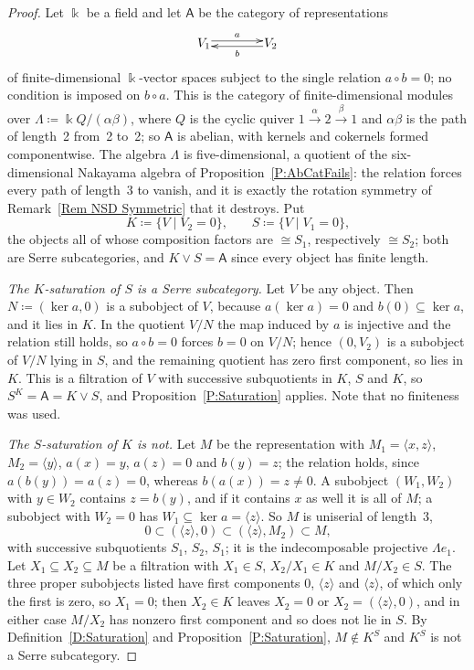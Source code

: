\documentclass[reqno,a4paper]{amsart}
\numberwithin{equation}{section}
\theoremstyle{plain}
\theoremstyle{definition}
\def\nameit#1{\textrm{#1}~}
\def\prox{\nameit{Proposition}}
\def\defx{\nameit{Definition}}
\def\remx{\nameit{Remark}}
\newcommand{\comp}{\circ}
\newcommand{\iso}{\cong}
\newcommand{\onecat}[1]{\ensuremath{\mathsf{#1}}\xspace}
\renewcommand{\1}{\onecat{1}}
\begin{document}
\begin{proof}
	Let \(\Bbbk\) be a field and let \(\onecat{A}\) be the category of representations
	\[
		\xymatrix@1@C=4em{V_{1} \ar@<.5ex>[r]^-{a} & V_{2} \ar@<.5ex>[l]^-{b}}
	\]
	of finite-dimensional \(\Bbbk\)-vector spaces subject to the single relation \(a\comp b=0\); no condition is imposed on \(b\comp a\). This is the category of finite-dimensional modules over \(\Lambda\coloneq\Bbbk Q/(\alpha\beta)\), where \(Q\) is the cyclic quiver \(1\xrightarrow{\alpha}2\xrightarrow{\beta}1\) and \(\alpha\beta\) is the path of length~2 from~2 to~2; so \(\onecat{A}\) is abelian, with kernels and cokernels formed componentwise. The algebra \(\Lambda\) is five-dimensional, a quotient of the six-dimensional Nakayama algebra of \prox\ref{P:AbCatFails}: the relation forces every path of length~3 to vanish, and it is exactly the rotation symmetry of \remx\ref{Rem NSD Symmetric} that it destroys. Put
	\[
		K\coloneq\{V\mid V_{2}=0\}\text{,}\qquad S\coloneq\{V\mid V_{1}=0\}\text{,}
	\]
	the objects all of whose composition factors are \(\iso S_{1}\), respectively \(\iso S_{2}\); both are Serre subcategories, and \(K\vee S=\onecat{A}\) since every object has finite length.

	\emph{The \(K\)-saturation of \(S\) is a Serre subcategory.} Let \(V\) be any object. Then \(N\coloneq(\ker a,0)\) is a subobject of \(V\), because \(a(\ker a)=0\) and \(b(0)\subseteq\ker a\), and it lies in \(K\). In the quotient \(V/N\) the map induced by \(a\) is injective and the relation still holds, so \(a\comp b=0\) forces \(b=0\) on \(V/N\); hence \((0,V_{2})\) is a subobject of \(V/N\) lying in \(S\), and the remaining quotient has zero first component, so lies in \(K\). This is a filtration of \(V\) with successive subquotients in \(K\), \(S\) and \(K\), so \(S^{K}=\onecat{A}=K\vee S\), and \prox\ref{P:Saturation} applies. Note that no finiteness was used.

	\emph{The \(S\)-saturation of \(K\) is not.} Let \(M\) be the representation with \(M_{1}=\langle x,z\rangle\), \(M_{2}=\langle y\rangle\), \(a(x)=y\), \(a(z)=0\) and \(b(y)=z\); the relation holds, since \(a(b(y))=a(z)=0\), whereas \(b(a(x))=z\neq0\). A subobject \((W_{1},W_{2})\) with \(y\in W_{2}\) contains \(z=b(y)\), and if it contains \(x\) as well it is all of \(M\); a subobject with \(W_{2}=0\) has \(W_{1}\subseteq\ker a=\langle z\rangle\). So \(M\) is uniserial of length~3,
	\[
		0\subset(\langle z\rangle,0)\subset(\langle z\rangle,M_{2})\subset M\text{,}
	\]
	with successive subquotients \(S_{1}\), \(S_{2}\), \(S_{1}\); it is the indecomposable projective \(\Lambda e_{1}\). Let \(X_{1}\subseteq X_{2}\subseteq M\) be a filtration with \(X_{1}\in S\), \(X_{2}/X_{1}\in K\) and \(M/X_{2}\in S\). The three proper subobjects listed have first components \(0\), \(\langle z\rangle\) and \(\langle z\rangle\), of which only the first is zero, so \(X_{1}=0\); then \(X_{2}\in K\) leaves \(X_{2}=0\) or \(X_{2}=(\langle z\rangle,0)\), and in either case \(M/X_{2}\) has nonzero first component and so does not lie in \(S\). By \defx\ref{D:Saturation} and \prox\ref{P:Saturation}, \(M\notin K^{S}\) and \(K^{S}\) is not a Serre subcategory.


\end{proof}
\end{document}

